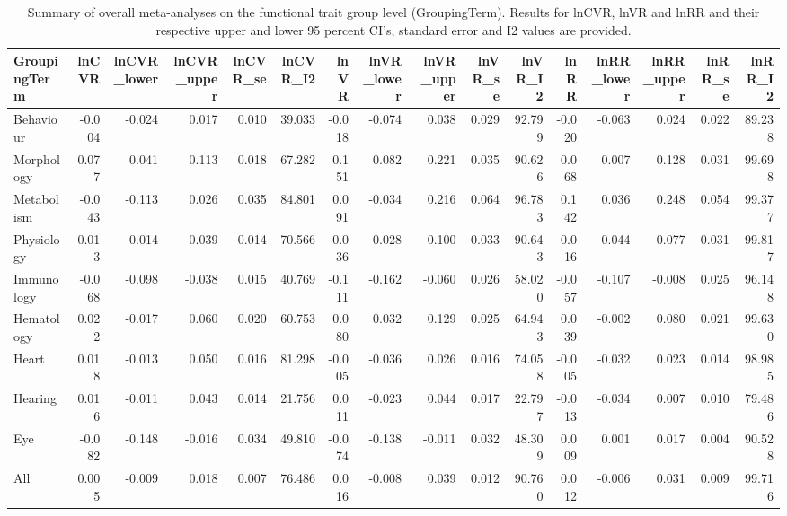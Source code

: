 \documentclass[]{article}
\begin{document}
\begin{table}

\caption{\label{tab:Table4}Summary of overall meta-analyses on the functional trait group level (GroupingTerm). Results for lnCVR, lnVR and lnRR and their respective upper and lower 95 percent CI's, standard error and I2 values are provided.}
\centering
\begin{tabular}[t]{l|r|r|r|r|r|r|r|r|r|r|r|r|r|r|r}
\hline
GroupingTerm & lnCVR & lnCVR\_lower & lnCVR\_upper & lnCVR\_se & lnCVR\_I2 & lnVR & lnVR\_lower & lnVR\_upper & lnVR\_se & lnVR\_I2 & lnRR & lnRR\_lower & lnRR\_upper & lnRR\_se & lnRR\_I2\\
\hline
Behaviour & -0.004 & -0.024 & 0.017 & 0.010 & 39.033 & -0.018 & -0.074 & 0.038 & 0.029 & 92.799 & -0.020 & -0.063 & 0.024 & 0.022 & 89.238\\
\hline
Morphology & 0.077 & 0.041 & 0.113 & 0.018 & 67.282 & 0.151 & 0.082 & 0.221 & 0.035 & 90.626 & 0.068 & 0.007 & 0.128 & 0.031 & 99.698\\
\hline
Metabolism & -0.043 & -0.113 & 0.026 & 0.035 & 84.801 & 0.091 & -0.034 & 0.216 & 0.064 & 96.783 & 0.142 & 0.036 & 0.248 & 0.054 & 99.377\\
\hline
Physiology & 0.013 & -0.014 & 0.039 & 0.014 & 70.566 & 0.036 & -0.028 & 0.100 & 0.033 & 90.643 & 0.016 & -0.044 & 0.077 & 0.031 & 99.817\\
\hline
Immunology & -0.068 & -0.098 & -0.038 & 0.015 & 40.769 & -0.111 & -0.162 & -0.060 & 0.026 & 58.020 & -0.057 & -0.107 & -0.008 & 0.025 & 96.148\\
\hline
Hematology & 0.022 & -0.017 & 0.060 & 0.020 & 60.753 & 0.080 & 0.032 & 0.129 & 0.025 & 64.943 & 0.039 & -0.002 & 0.080 & 0.021 & 99.630\\
\hline
Heart & 0.018 & -0.013 & 0.050 & 0.016 & 81.298 & -0.005 & -0.036 & 0.026 & 0.016 & 74.058 & -0.005 & -0.032 & 0.023 & 0.014 & 98.985\\
\hline
Hearing & 0.016 & -0.011 & 0.043 & 0.014 & 21.756 & 0.011 & -0.023 & 0.044 & 0.017 & 22.797 & -0.013 & -0.034 & 0.007 & 0.010 & 79.486\\
\hline
Eye & -0.082 & -0.148 & -0.016 & 0.034 & 49.810 & -0.074 & -0.138 & -0.011 & 0.032 & 48.309 & 0.009 & 0.001 & 0.017 & 0.004 & 90.528\\
\hline
All & 0.005 & -0.009 & 0.018 & 0.007 & 76.486 & 0.016 & -0.008 & 0.039 & 0.012 & 90.760 & 0.012 & -0.006 & 0.031 & 0.009 & 99.716\\
\hline
\end{tabular}
\end{table}
\end{document}
